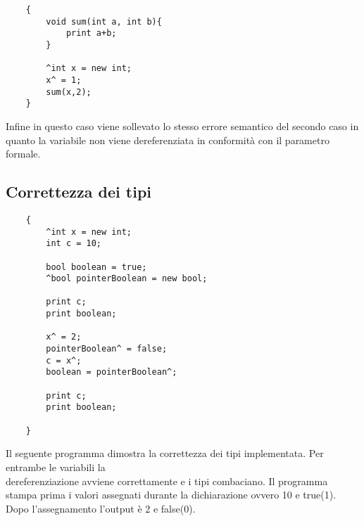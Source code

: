 \documentclass[../../main]{subfiles}
\begin{document}
\begin{lstlisting}
    {
        void sum(int a, int b){
            print a+b;
        }

        ^int x = new int;
        x^ = 1;
        sum(x,2);
    }
\end{lstlisting}
Infine in questo caso viene sollevato lo stesso errore semantico del secondo caso in quanto la variabile non viene dereferenziata in conformità con il parametro formale.

\subsection{Correttezza dei tipi}
\begin{lstlisting}
    {
        ^int x = new int;
        int c = 10;

        bool boolean = true;
        ^bool pointerBoolean = new bool;

        print c;
        print boolean;

        x^ = 2;
        pointerBoolean^ = false;
        c = x^;
        boolean = pointerBoolean^;

        print c;
        print boolean;

    }
\end{lstlisting}
Il seguente programma dimostra la correttezza dei tipi implementata. Per entrambe le variabili la \\ dereferenziazione avviene correttamente e i tipi combaciano.
Il programma stampa prima i valori assegnati durante la dichiarazione ovvero 10 e true(1). Dopo l'assegnamento l'output è 2 e false(0).
\end{document}
